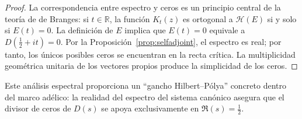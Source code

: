 \begin{proof}
La correspondencia entre espectro y ceros es un principio central de la teoría
de de Branges: si $t\in\mathbb{R}$, la función $K_t(z)$ es ortogonal a $\mathcal{H}(E)$
si y solo si $E(t)=0$.  La definición de $E$ implica que $E(t)=0$ equivale a
$D\!\left(\tfrac{1}{2}+it\right)=0$.  Por la Proposición~\ref{prop:selfadjoint}, el espectro es
real; por tanto, los únicos posibles ceros se encuentran en la recta crítica.  La
multiplicidad geométrica unitaria de los vectores propios produce la simplicidad
de los ceros.
\end{proof}

Este análisis espectral proporciona un ``gancho Hilbert--Pólya'' concreto dentro
del marco adélico: la realidad del espectro del sistema canónico asegura que el
divisor de ceros de $D(s)$ se apoya exclusivamente en $\Re(s)=\tfrac{1}{2}$.

